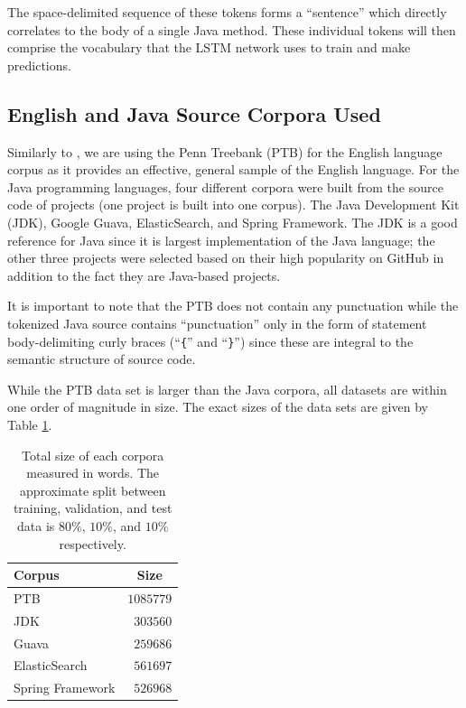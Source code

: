 \documentclass{article}
\begin{document}
The space-delimited sequence of these tokens forms a ``sentence'' which  
directly  correlates to the body of a single Java method. These individual  
tokens will then comprise the vocabulary that the LSTM network uses to train 
and make predictions.

\subsection{English and Java Source Corpora Used}

Similarly to \citet{LSTMArticle}, we are using the Penn Treebank (PTB) for the
English language corpus as it provides an effective, general sample of the English
language. %
For the Java programming languages, four different corpora were built from
the source code of projects (one project is built into one corpus). The
Java Development Kit (JDK), Google Guava, ElasticSearch, and Spring Framework.
The JDK is a good reference for Java since it is largest implementation
of the Java language; the other three projects were selected based on their
high popularity on GitHub in addition to the fact they are
Java-based projects.

It is important to note that the
PTB does not contain any punctuation while the tokenized
Java source contains ``punctuation'' only in the form of statement
body-delimiting curly braces (``\texttt\{'' and ``\texttt\}'')
since these are integral to the semantic structure of source code.


While the PTB data set is larger than the Java corpora, all datasets
are within one order of magnitude in size. The exact sizes of the
data sets are given by Table \ref{size-table}.

\begin{table}[t]
    \caption{Total size of each corpora measured in words. The approximate
    split between training, validation, and test data is $80\%$, $10\%$,
    and $10\%$ respectively.}
    \label{size-table}
    \vskip 0.15in
    \begin{center}
    \begin{tabular}{lr}
    \hline
    Corpus & \multicolumn{1}{c}{Size} \\
    \hline
    \abovespace
    PTB                 & $1085779$ \\
    JDK                 & $303560$ \\
    Guava               & $259686$ \\
    ElasticSearch       & $561697$ \\
    \belowspace
    Spring Framework    & $526968$ \\
    \hline
    \end{tabular}
    \end{center}
    \vskip -0.1in
\end{table}
\end{document}

